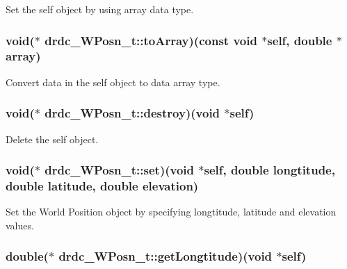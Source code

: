 Set the self object by using array data type. 

\hypertarget{structdrdc__WPosn__t_45788bc5d5ba40aa2890961c2364c9fc}{
\subsubsection[toArray]{\setlength{\rightskip}{0pt plus 5cm}void($\ast$ {\bf drdc\_\-WPosn\_\-t::toArray})(const void $\ast$self, double $\ast$array)}}
\label{structdrdc__WPosn__t_45788bc5d5ba40aa2890961c2364c9fc}


Convert data in the self object to data array type. 

\hypertarget{structdrdc__WPosn__t_00eb6655406a586c34d82e77117ec8d8}{
\subsubsection[destroy]{\setlength{\rightskip}{0pt plus 5cm}void($\ast$ {\bf drdc\_\-WPosn\_\-t::destroy})(void $\ast$self)}}
\label{structdrdc__WPosn__t_00eb6655406a586c34d82e77117ec8d8}


Delete the self object. 

\hypertarget{structdrdc__WPosn__t_fd8e615f0e7a48e527bb5b55106778a6}{
\subsubsection[set]{\setlength{\rightskip}{0pt plus 5cm}void($\ast$ {\bf drdc\_\-WPosn\_\-t::set})(void $\ast$self, double longtitude, double latitude, double elevation)}}
\label{structdrdc__WPosn__t_fd8e615f0e7a48e527bb5b55106778a6}


Set the World Position object by specifying longtitude, latitude and elevation values. 

\hypertarget{structdrdc__WPosn__t_c3719421bea672a15fd2163ecb4db363}{
\subsubsection[getLongtitude]{\setlength{\rightskip}{0pt plus 5cm}double($\ast$ {\bf drdc\_\-WPosn\_\-t::getLongtitude})(void $\ast$self)}}
\label{structdrdc__WPosn__t_c3719421bea672a15fd2163ecb4db363}


